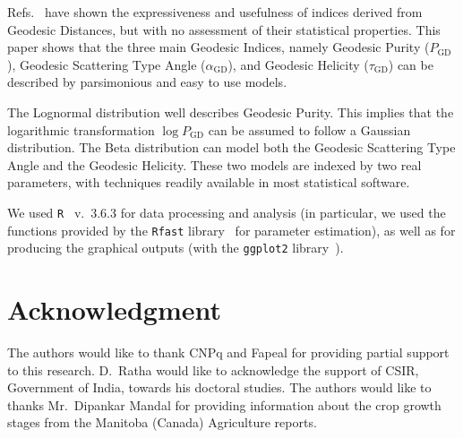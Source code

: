 \documentclass[journal]{IEEEtran}
\begin{document}
	Refs.~\cite{ClassificationPolSARGeodesic,AGeneralizedVolumeScatteringModelBasedVegetationIndexfromPolarimetricSARData2019,NovelTechniquesforBuiltupAreaExtractionfromPolarimetricSARImages2019,APolSARScatteringPowerFactorizationFrameworkandNovelRollInvariantParametersBasedUnsupervisedClassificationSchemeUsingaGeodesicDistanceinpress,ChangeDetectionPolSARGeodesicDistanceBetweenScatteringMechanisms,ARadarVegetationIndexforCropMonitoringUsingCompactPolarimetricSARData}
	have shown the expressiveness and usefulness of indices derived from Geodesic Distances, but with no assessment of their statistical properties.
	This paper shows that the three main Geodesic Indices, namely
	Geodesic Purity ($P_{\text{GD}}$),
	Geodesic Scattering Type Angle ($\alpha_{\text{GD}}$), and
	Geodesic Helicity ($\tau_{\text{GD}}$) can be described by parsimonious and easy to use models.
	
	The Lognormal distribution well describes Geodesic Purity.
	This implies that the logarithmic transformation $\log P_{\text{GD}}$ can be assumed to follow a Gaussian distribution.
	The Beta distribution can model both the Geodesic Scattering Type Angle and the Geodesic Helicity.
	These two models are indexed by two real parameters, with techniques readily available in most statistical software.
	
	We used \texttt{R}~\cite{RManual} v.~3.6.3 for data processing and analysis (in particular, we used the functions provided by the \texttt{Rfast} library~\cite{Rfast} for parameter estimation), as well as for producing the graphical outputs (with the \texttt{ggplot2} library~\cite{ggplot2}).
	
	\section*{Acknowledgment}
	
	The authors would like to thank CNPq and Fapeal for providing partial support to this research. 
	D.\ Ratha would like to acknowledge the support of CSIR, Government of India, towards his doctoral studies. The authors would like to thanks Mr.\ Dipankar Mandal for providing information about the crop growth stages from the Manitoba (Canada) Agriculture reports.
	
	
	
	
\end{document}

